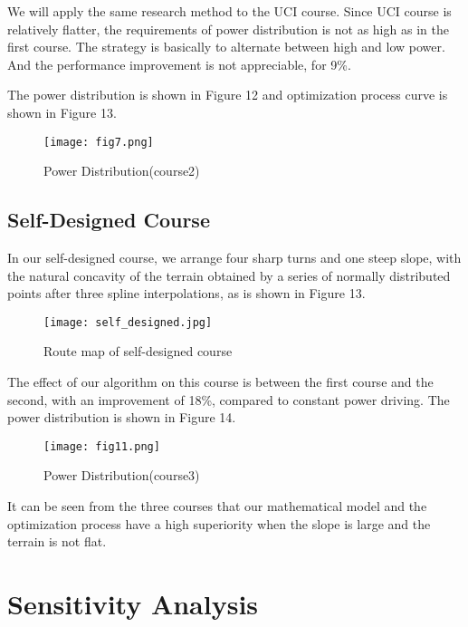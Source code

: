 \documentclass{mcmthesis}
\begin{document}
We will apply the same research method to the UCI course. Since UCI course is relatively flatter, the requirements of power distribution is not as high as in the first course. The strategy is basically to alternate between high and low power. And the performance improvement is not appreciable, for 9\%. 

The power distribution is shown in Figure 12 and optimization process curve is shown in Figure 13.
\begin{figure}[h]
	\small
	\centering
	\texttt{[image: fig7.png]}
	\caption{Power Distribution(course2)} 
\end{figure}




\subsection{Self-Designed Course}

In our self-designed course, we arrange four sharp turns and one steep slope, with the natural concavity of the terrain obtained by a series of normally distributed points after three spline interpolations, as is shown in Figure 13.
\begin{figure}[h]
	\small
	\centering
	\texttt{[image: self\_designed.jpg]}
	\caption{Route map of self-designed course} 
\end{figure}

The effect of our algorithm on this course is between the first course and the second, with an improvement of 18\%, compared to constant power driving. The power distribution is shown in Figure 14.
 \begin{figure}[h]
	\small
	\centering
	\texttt{[image: fig11.png]}
	\caption{Power Distribution(course3)} 
\end{figure}

It can be seen from the three courses that our mathematical model and the optimization process have a high superiority when the slope is large and the terrain is not flat.









\section{Sensitivity Analysis}
\end{document}
